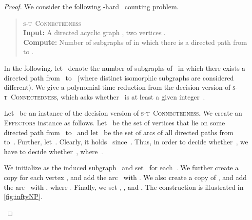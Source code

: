 \documentclass{article}
\newcommand{\probSharpDef}[3]{
  \begin{quote}
    #1 \\
    \textbf{Input:} #2 \\
    \textbf{Compute:} #3
  \end{quote}
}
\newcommand{\probSTConnectness}{\textsc{s-t~Connectedness}\xspace}
\newcommand{\probEffectors}{\textsc{Effectors}\xspace}
\begin{document}
\begin{proof}
  We consider the following -hard~\cite{VLG1979A} counting problem.
  \probSharpDef
    {\probSTConnectness}
    {A directed acyclic graph , two vertices .}
    {Number of subgraphs of  in which there is a directed path from  to .}
  
  In the following, let~ denote the number of subgraphs
  of~ in which there exists a directed path from~ to~ (where distinct isomorphic subgraphs are considered different).
  We give a polynomial-time reduction from the decision version of
  \probSTConnectness, which asks whether~ is at least
  a given integer~.
  
  Let~ be an instance of the decision version of \probSTConnectness.
  We create an \probEffectors instance 
  as follows.
  Let~ be the set of vertices that
  lie on some directed path from~ to~ and let~ be the set of arcs of all directed paths from~ to~.
  Further, let~.
  Clearly, it holds~ since~.
  Thus, in order to decide whether~, we have to
  decide whether~, where~.
  
  We initialize  as the induced subgraph~
  and set~ for each~.
  We further create a copy  for each vertex ,
  and add the arc~ with .
  We also create a copy  of ,
  and add the arc~ with , where .
  Finally, we set , , and .
  The construction is illustrated in \autoref{fig:inftyNP}.
  \begin{figure}[t]
    \centering
    \hspace{8em}
\end{figure}
\end{proof}
\end{document}
